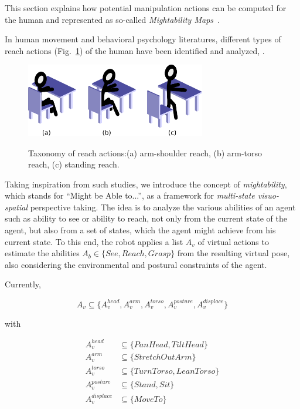\documentclass{svmult}
\begin{document}
This section explains how potential manipulation actions can be computed for
the human and represented as so-called \emph{Mightability Maps}~\cite{Pandey2010}.

In human movement and behavioral psychology literatures, different types of
reach actions (Fig.~\ref{fig|reaches_taxonomy}) of the human have been
identified and analyzed, \cite{Gardner2001, Choi2004}.

\begin{figure}
  \centering
  \includegraphics[width=0.7\textwidth]{./figs/reach_postures.pdf} \\
  \caption {Taxonomy of reach actions:(a) arm-shoulder reach, (b) arm-torso 
  reach, (c) standing reach.}
  \label{fig|reaches_taxonomy}
\end{figure}

Taking inspiration from such studies, we introduce the concept of
\emph{mightability}, which stands for ``Might be Able to...'', as a framework
for \emph{multi-state visuo-spatial} perspective taking. The idea is to analyze
the various abilities of an agent such as ability to see or ability to
reach, not only from the current state of the agent, but also from a set of
states, which the agent might achieve from his current state. To this end,
the robot applies a list $A_v$ of virtual actions to estimate the abilities
$A_b \in \{See, Reach, Grasp\}$ from the resulting virtual pose, also
considering the environmental and postural constraints of the agent.

Currently,

\[ 
A_v \subseteq \{A_v^{head}, A_v^{arm}, A_v^{torso}, A_v^{posture}, A_v^{displace}\}
\]

with

\begin{align*}
A_v^{head} & \subseteq \{PanHead, TiltHead\} \\
A_v^{arm} & \subseteq \{StretchOutArm\} \\
A_v^{torso} & \subseteq \{TurnTorso, LeanTorso\} \\
A_v^{posture} & \subseteq \{Stand, Sit\} \\
A_v^{displace} & \subseteq \{MoveTo\} \\
\end{align*}
\end{document}
